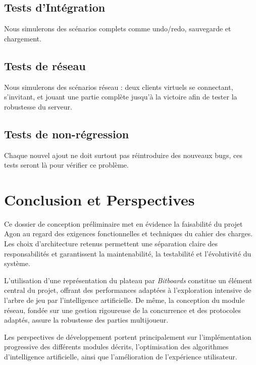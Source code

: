 \documentclass[9pt]{extarticle} %
\begin{document}
\subsection{Tests d'Intégration}
Nous simulerons des scénarios complets comme undo/redo, sauvegarde et chargement.
\subsection{Tests de réseau}
Nous simulerons des scénarios réseau : deux clients virtuels se connectant, s'invitant, et jouant une partie complète jusqu'à la victoire afin de tester la robustesse du serveur.
\subsection{Tests de non-régression}
Chaque nouvel ajout ne doit surtout pas réintroduire des nouveaux bugs, ces tests seront là pour vérifier ce problème.

\section{Conclusion et Perspectives}

Ce dossier de conception préliminaire met en évidence la faisabilité du projet Agon
au regard des exigences fonctionnelles et techniques du cahier des charges.
Les choix d’architecture retenus permettent une séparation claire des responsabilités et garantissent la maintenabilité, la testabilité et l’évolutivité du système.

L’utilisation d’une représentation du plateau par \textit{Bitboards} constitue un élément
central du projet, offrant des performances adaptées à l’exploration intensive de l’arbre
de jeu par l’intelligence artificielle. De même, la conception du module réseau, fondée sur
une gestion rigoureuse de la concurrence et des protocoles adaptés, assure la robustesse
des parties multijoueur.

Les perspectives de développement portent principalement sur l’implémentation progressive
des différents modules décrits, l’optimisation des algorithmes d’intelligence artificielle,
ainsi que l’amélioration de l’expérience utilisateur.

\nocite{*}


\end{document}
